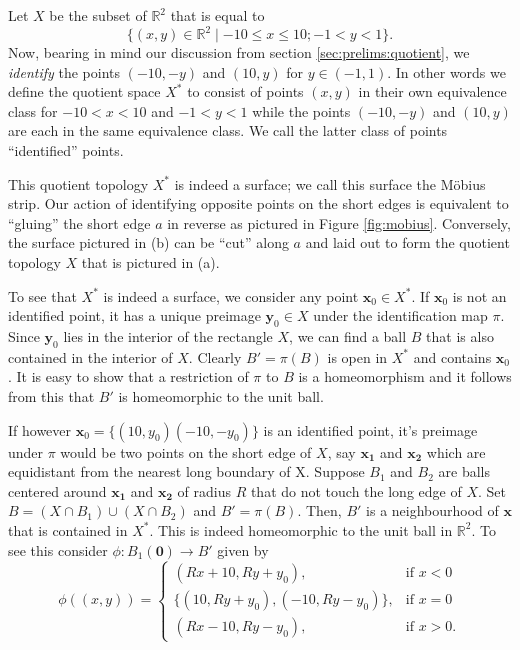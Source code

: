 \begin{exmp}
  \label{exmp:mobius}
  Let $X$ be the subset of $\mathbb{R}^2$ that is equal to
  \[
    \{ (x,y) \in \mathbb{R}^2 \mid -10 \leq x \leq 10 ; -1 < y < 1 \}.
  \]
  Now, bearing in mind our discussion from section
  \ref{sec:prelims:quotient}, we \emph{identify} the points $(-10,-y)$
  and $(10,y)$ for $y \in (-1,1)$. In other words we define the
  quotient space $X^*$ to consist of points $(x,y)$ in their own
  equivalence class for $-10 < x < 10$ and $-1 < y < 1$ while the
  points $(-10,-y)$ and $(10,y)$ are each in the same equivalence
  class. We call the latter class of points ``identified'' points.

  This quotient topology $X^*$ is indeed a surface; we call this
  surface the M\"obius strip. Our action of identifying opposite
  points on the short edges is equivalent to ``gluing'' the short
  edge $a$ in reverse as pictured in Figure
  \ref{fig:mobius}. Conversely, the surface pictured in (b) can be
  ``cut'' along $a$ and laid out to form the quotient topology $X$
  that is pictured in (a). 
  
  To see that $X^*$ is indeed a surface, we consider any point
  $\mathbf{x}_0 \in X^*$. If $\mathbf{x}_0$ is not an identified point, it
  has a unique preimage $\mathbf{y}_0 \in X$ under the identification
  map $\pi$. Since $\mathbf{y}_0$ lies in the interior of the rectangle
  $X$, we can find a ball $B$ that is also contained in the interior
  of $X$. Clearly $B' = \pi(B)$ is open in $X^*$ and contains
  $\mathbf{x}_0$. It is easy to show that a restriction of $\pi$ to $B$
  is a homeomorphism and it follows from this that $B'$ is
  homeomorphic to the unit ball.

  If however $\mathbf{x}_0 = \{ (10,y_0) (-10,-y_0) \}$ is an
  identified point, it's preimage under $\pi$ would be two points on
  the short  edge of $X$, say $\mathbf{x_1}$ and $\mathbf{x_2}$ which
  are equidistant from the nearest long boundary of  X. Suppose $B_1$
  and $B_2$ are balls centered around $\mathbf{x_1}$ and
  $\mathbf{x_2}$ of radius $R$ that do not touch the long edge of
  $X$. Set $B = (X \cap B_1) \cup (X \cap B_2)$ and $B' =
  \pi(B)$. Then, $B'$ is a neighbourhood of $\mathbf{x}$ that is
  contained in $X^*$. This is indeed homeomorphic to the unit ball in
  $\mathbb{R}^2$. To see this consider $\phi: B_1(\mathbf{0})
  \rightarrow B'$ given by 
  \[
    \phi((x,y)) =
    \begin{cases}
      (Rx + 10, Ry + y_0), & \text{if $x < 0$} \\
      \{(10, Ry + y_0),(-10, Ry - y_0)\}, & \text{if $x = 0$} \\
      (Rx - 10, Ry - y_0), & \text{if $x > 0$}.
    \end{cases}
  \]


\end{exmp}
